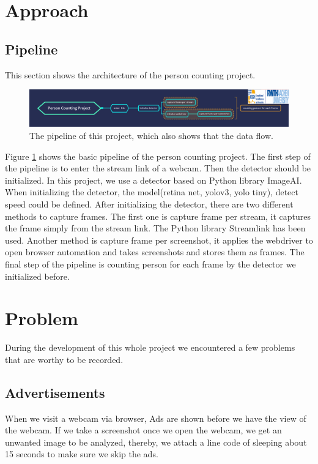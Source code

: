 \documentclass[runningheads]{llncs}
\begin{document}
\section{Approach}
\subsection{Pipeline}
This section shows the architecture of the person counting project.

\begin{figure}
\includegraphics[width=\textwidth]{figs/pipeline.png}
\caption{The pipeline of this project, which also shows that the data flow.} \label{fig1}
\end{figure}

 Figure \ref{fig1} shows the basic pipeline of the person counting project. The first step of the pipeline is to enter the stream link of a webcam. Then the detector should be initialized. In this project, we use a detector based on Python library ImageAI. When initializing the detector, the model(retina net, yolov3, yolo tiny), detect speed could be defined. After initializing the detector, there are two different methods to capture frames. The first one is capture frame per stream, it captures the frame simply from the stream link. The Python library Streamlink has been used. Another method is capture frame per screenshot, it applies the webdriver to open browser automation and takes screenshots and stores them as frames. The final step of the pipeline is counting person for each frame by the detector we initialized before.  


\section{Problem}
During the development of this whole project we encountered a few problems that are worthy to be recorded. 

\subsection{Advertisements}
When we visit a webcam via browser, Ads are shown before we have the view of the webcam. If we take a screenshot once we open the webcam, we get an unwanted image to be analyzed, thereby, we attach a line code of sleeping about 15 seconds to make sure we skip the ads.
\end{document}
